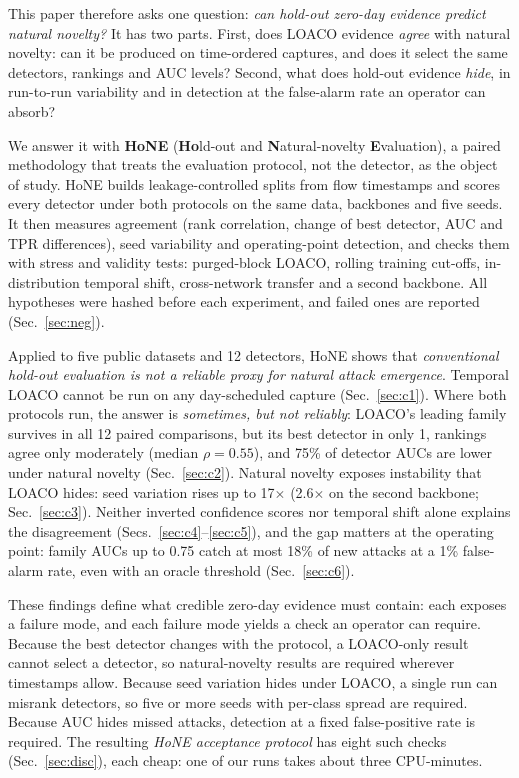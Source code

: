 \documentclass[conference]{IEEEtran}
\begin{document}
This paper therefore asks one question: \emph{can hold-out zero-day evidence predict natural novelty?} It has two parts. First, does LOACO evidence \emph{agree} with natural novelty: can it be produced on time-ordered captures, and does it select the same detectors, rankings and AUC levels? Second, what does hold-out evidence \emph{hide}, in run-to-run variability and in detection at the false-alarm rate an operator can absorb?

We answer it with \textbf{HoNE} (\textbf{Ho}ld-out and \textbf{N}atural-novelty \textbf{E}valuation), a paired methodology that treats the evaluation protocol, not the detector, as the object of study. HoNE builds leakage-controlled splits from flow timestamps and scores every detector under both protocols on the same data, backbones and five seeds. It then measures agreement (rank correlation, change of best detector, AUC and TPR differences), seed variability and operating-point detection, and checks them with stress and validity tests: purged-block LOACO, rolling training cut-offs, in-distribution temporal shift, cross-network transfer and a second backbone. All hypotheses were hashed before each experiment, and failed ones are reported (Sec.~\ref{sec:neg}).

Applied to five public datasets and 12 detectors, HoNE shows that \emph{conventional hold-out evaluation is not a reliable proxy for natural attack emergence}. Temporal LOACO cannot be run on any day-scheduled capture (Sec.~\ref{sec:c1}). Where both protocols run, the answer is \emph{sometimes, but not reliably}: LOACO's leading family survives in all 12 paired comparisons, but its best detector in only 1, rankings agree only moderately (median $\rho{=}0.55$), and 75\% of detector AUCs are lower under natural novelty (Sec.~\ref{sec:c2}). Natural novelty exposes instability that LOACO hides: seed variation rises up to 17$\times$ (2.6$\times$ on the second backbone; Sec.~\ref{sec:c3}). Neither inverted confidence scores nor temporal shift alone explains the disagreement (Secs.~\ref{sec:c4}--\ref{sec:c5}), and the gap matters at the operating point: family AUCs up to 0.75 catch at most 18\% of new attacks at a 1\% false-alarm rate, even with an oracle threshold (Sec.~\ref{sec:c6}).

These findings define what credible zero-day evidence must contain: each exposes a failure mode, and each failure mode yields a check an operator can require. Because the best detector changes with the protocol, a LOACO-only result cannot select a detector, so natural-novelty results are required wherever timestamps allow. Because seed variation hides under LOACO, a single run can misrank detectors, so five or more seeds with per-class spread are required. Because AUC hides missed attacks, detection at a fixed false-positive rate is required. The resulting \emph{HoNE acceptance protocol} has eight such checks (Sec.~\ref{sec:disc}), each cheap: one of our runs takes about three CPU-minutes.
\end{document}
